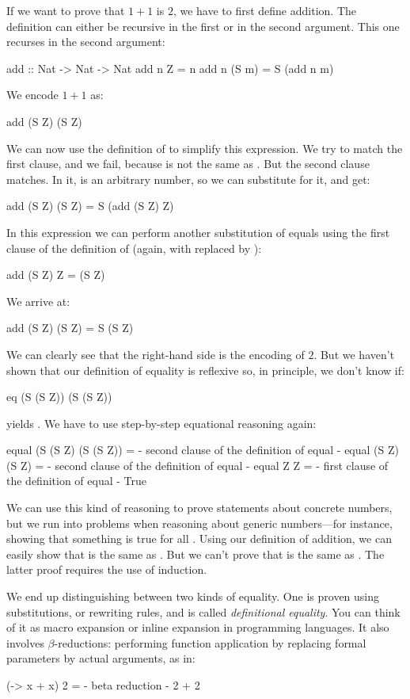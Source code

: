 \documentclass[DaoFP]{subfiles}
\begin{document}
If we want to prove that $1+1$ is $2$, we have to first define addition. The definition can either be recursive in the first or in the second argument. This one recurses in the second argument:
\begin{haskell}
add :: Nat -> Nat -> Nat
add n Z = n
add n (S m) = S (add n m)
\end{haskell}
We encode $1 + 1$ as:
\begin{haskell}
add (S Z) (S Z)
\end{haskell}
We can now use the definition of  to simplify this expression. We try to match the first clause, and we fail, because  is not the same as . But the second clause matches. In it,  is an arbitrary number, so we can substitute  for it, and get:
\begin{haskell}
add (S Z) (S Z) = S (add (S Z) Z)
\end{haskell}
In this expression we can perform another substitution of equals using the first clause of the definition of  (again, with  replaced by ):
\begin{haskell}
add (S Z) Z = (S Z)
\end{haskell}
We arrive at:
\begin{haskell}
add (S Z) (S Z) = S (S Z)
\end{haskell}
We can clearly see that the right-hand side is the encoding of $2$. But we haven't shown that our definition of equality is reflexive so, in principle, we don't know if:
\begin{haskell}
eq (S (S Z)) (S (S Z))
\end{haskell}
yields . We have to use step-by-step equational reasoning again:
\begin{haskell}
equal (S (S Z) (S (S Z)) =
{- second clause of the definition of equal -}
equal (S Z) (S Z) =
{- second clause of the definition of equal -}
equal Z Z =
{- first clause of the definition of equal -}
True
\end{haskell}

We can use this kind of reasoning to prove statements about concrete numbers, but we run into problems when reasoning about generic numbers---for instance, showing that something is true for all . Using our definition of addition, we can easily show that  is the same as . But we can't prove that  is the same as . The latter proof requires the use of induction. 

We end up distinguishing between two kinds of equality. One is proven using substitutions, or rewriting rules, and is called \emph{definitional equality}. You can think of it as macro expansion or inline expansion in programming languages. It also involves $\beta$-reductions: performing function application by replacing formal parameters by actual arguments, as in:
\begin{haskell}
(\x -> x + x) 2 =
{- beta reduction -}
2 + 2
\end{haskell}
\end{document}
